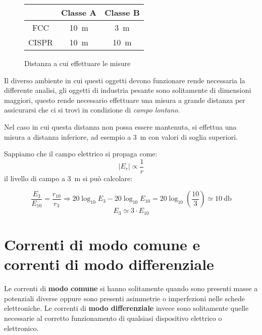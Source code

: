 \begin{figure}[h]
\begin{center}
\begin{tabular}{|c|c|c|}
  \hline
       & Classe A        & Classe B       \\ \hline
 FCC   & \SI{10}{\meter} & \SI{3}{\meter} \\ \hline
 CISPR & \SI{10}{\meter} &\SI{10}{\meter} \\ \hline
\end{tabular}
\end{center}
\caption{Distanza a cui effettuare le misure}
\end{figure}

Il diverso ambiente in cui questi oggetti devono funzionare rende necessaria la differente
analisi, gli oggetti di industria pesante sono solitamente di dimensioni maggiori,
questo rende necessario effettuare una misura a grande distanza per assicurarsi che 
ci si trovi in condizione di \textit{campo lontano}.

Nel caso in cui questa distanza non possa essere mantenuta, si effettua una misura
a distanza inferiore, ad esempio a \SI{3}{\meter} con valori di soglia superiori.

Sappiamo che il campo elettrico si propaga come:
$$
 \left|E_r \right| \propto \frac{1}{r} 
$$
il livello di campo a \SI{3}{\meter} si può calcolare:

$$
 \frac{E_3}{E_{10}} = \frac{r_{10}}{r_{3}} \Rightarrow 20\log_{10}E_3 - 20\log_{10}E_{10} = 20\log_{10}\left( \frac{10}{3}\right) \simeq \SI{10}{\decibel}
$$
$$
 E_3 \simeq 3\cdot E_{10}
$$

\section{Correnti di modo comune e correnti di modo differenziale}

Le correnti di \textbf{modo comune} si hanno solitamente quando sono presenti masse
a potenziali diverse oppure sono presenti asimmetrie o imperfezioni nelle schede elettroniche.
Le correnti di \textbf{modo differenziale} invece sono solitamente quelle necessarie al
corretto funzionamento di qualsiasi dispositivo elettrico o elettronico.


